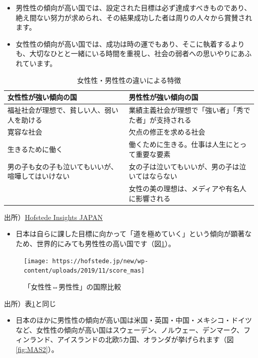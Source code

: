 \documentclass[
]{book}
\providecommand{\tightlist}{%
  \setlength{\itemsep}{0pt}\setlength{\parskip}{0pt}}
\begin{document}
\begin{itemize}
  \begin{itemize}
  \item
    男性性の傾向が高い国では、設定された目標は必ず達成すべきものであり、絶え間ない努力が求められ、その結果成功した者は周りの人々から賞賛されます。
  \item
    女性性の傾向が高い国では、成功は時の運でもあり、そこに執着するよりも、大切なひとと一緒にいる時間を重視し、社会の弱者への思いやりにあふれています。
  \end{itemize}
\end{itemize}

\begin{table}

\caption{\label{tab:MAS0}女性性・男性性の違いによる特徴}
\centering
\begin{tabular}[t]{l|l}
\hline
女性性が強い傾向の国 & 男性性が強い傾向の国\\
\hline
福祉社会が理想で、貧しい人、弱い人を助ける & 業績主義社会が理想で「強い者」「秀でた者」が支持される\\
\hline
寛容な社会 & 欠点の修正を求める社会\\
\hline
生きるために働く & 働くために生きる。仕事は人生にとって重要な要素\\
\hline
男の子も女の子も泣いてもいいが、喧嘩してはいけない & 女の子は泣いてもいいが、男の子は泣いてはならない\\
\hline
 & 女性の美の理想は、メディアや有名人に影響される\\
\hline
\end{tabular}
\end{table}

出所）\href{https://hofstede.jp/6dimentionsmodell_mas/}{Hofstede Insights JAPAN}

\begin{itemize}
\tightlist
\item
  日本は自らに課した目標に向かって「道を極めていく」という傾向が顕著なため、世界的にみても男性性の高い国です（図\ref{fig:MAS1}）。
\end{itemize}

\begin{figure}
\texttt{[image: https://hofstede.jp/new/wp-content/uploads/2019/11/score\_mas]} \caption{「女性性⇔男性性」の国際比較}\label{fig:MAS1}
\end{figure}

出所）表\ref{tab:MAS0}と同じ

\begin{itemize}
\tightlist
\item
  日本のほかに男性性の傾向が高い国は米国・英国・中国・メキシコ・ドイツなど、女性性の傾向が高い国はスウェーデン、ノルウェー、デンマーク、フィンランド、アイスランドの北欧5カ国、オランダが挙げられます（図\ref{fig:MAS2}）。
\end{itemize}
\end{document}
